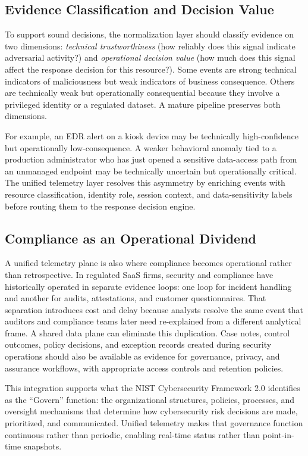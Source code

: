 \documentclass[unnumsec,webpdf,contemporary,large]{oup-authoring-template}
\theoremstyle{thmstyleone}
\theoremstyle{thmstyletwo}
\theoremstyle{thmstylethree}
\begin{document}
\subsection{Evidence Classification and Decision Value}

To support sound decisions, the normalization layer should classify evidence on two
dimensions: \textit{technical trustworthiness} (how reliably does this signal indicate
adversarial activity?) and \textit{operational decision value} (how much does this signal
affect the response decision for this resource?). Some events are strong technical
indicators of maliciousness but weak indicators of business consequence. Others are
technically weak but operationally consequential because they involve a privileged identity
or a regulated dataset. A mature pipeline preserves both dimensions.

For example, an EDR alert on a kiosk device may be technically high-confidence but
operationally low-consequence. A weaker behavioral anomaly tied to a production
administrator who has just opened a sensitive data-access path from an unmanaged endpoint
may be technically uncertain but operationally critical. The unified telemetry layer
resolves this asymmetry by enriching events with resource classification, identity role,
session context, and data-sensitivity labels before routing them to the response
decision engine.

\subsection{Compliance as an Operational Dividend}

A unified telemetry plane is also where compliance becomes operational rather than
retrospective. In regulated SaaS firms, security and compliance have historically operated
in separate evidence loops: one loop for incident handling and another for audits,
attestations, and customer questionnaires. That separation introduces cost and delay
because analysts resolve the same event that auditors and compliance teams later need
re-explained from a different analytical frame. A shared data plane can eliminate this
duplication. Case notes, control outcomes, policy decisions, and exception records created
during security operations should also be available as evidence for governance, privacy,
and assurance workflows, with appropriate access controls and retention policies.

This integration supports what the NIST Cybersecurity Framework 2.0 \cite{nistcsf2024}
identifies as the ``Govern'' function: the organizational structures, policies, processes,
and oversight mechanisms that determine how cybersecurity risk decisions are made, prioritized,
and communicated. Unified telemetry makes that governance function continuous rather than
periodic, enabling real-time status rather than point-in-time snapshots.
\end{document}

